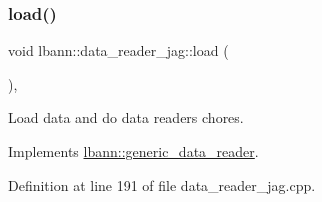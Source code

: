 \subsubsection{\texorpdfstring{load()}{load()}\hspace{0.1cm}{\footnotesize\ttfamily [1/2]}}
{\footnotesize\ttfamily void lbann\+::data\+\_\+reader\+\_\+jag\+::load (\begin{DoxyParamCaption}{ }\end{DoxyParamCaption})\hspace{0.3cm}{\ttfamily [override]}, {\ttfamily [virtual]}}



Load data and do data reader\textquotesingle{}s chores. 



Implements \hyperlink{classlbann_1_1generic__data__reader_afeb47703d988a230a59859cbfc178215}{lbann\+::generic\+\_\+data\+\_\+reader}.



Definition at line 191 of file data\+\_\+reader\+\_\+jag.\+cpp.


